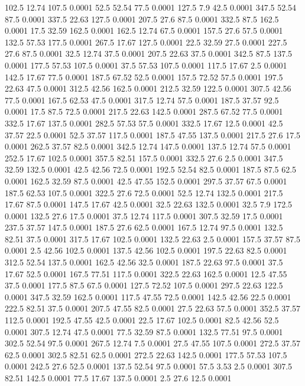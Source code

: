 102.5	12.74	107.5	0.0001
52.5	52.54	77.5	0.0001
127.5	7.9	42.5	0.0001
347.5	52.54	87.5	0.0001
337.5	22.63	127.5	0.0001
207.5	27.6	87.5	0.0001
332.5	87.5	162.5	0.0001
17.5	32.59	162.5	0.0001
162.5	12.74	67.5	0.0001
157.5	27.6	57.5	0.0001
132.5	57.53	177.5	0.0001
267.5	17.67	127.5	0.0001
22.5	32.59	27.5	0.0001
227.5	27.6	87.5	0.0001
32.5	12.74	37.5	0.0001
207.5	22.63	37.5	0.0001
342.5	87.5	137.5	0.0001
177.5	57.53	107.5	0.0001
37.5	57.53	107.5	0.0001
117.5	17.67	2.5	0.0001
142.5	17.67	77.5	0.0001
187.5	67.52	52.5	0.0001
157.5	72.52	57.5	0.0001
197.5	22.63	47.5	0.0001
312.5	42.56	162.5	0.0001
212.5	32.59	122.5	0.0001
307.5	42.56	77.5	0.0001
167.5	62.53	47.5	0.0001
317.5	12.74	57.5	0.0001
187.5	37.57	92.5	0.0001
17.5	87.5	72.5	0.0001
217.5	22.63	142.5	0.0001
287.5	67.52	77.5	0.0001
332.5	17.67	137.5	0.0001
282.5	57.53	57.5	0.0001
332.5	17.67	12.5	0.0001
42.5	37.57	22.5	0.0001
52.5	37.57	117.5	0.0001
187.5	47.55	137.5	0.0001
217.5	27.6	17.5	0.0001
262.5	37.57	82.5	0.0001
342.5	12.74	147.5	0.0001
137.5	12.74	57.5	0.0001
252.5	17.67	102.5	0.0001
357.5	82.51	157.5	0.0001
332.5	27.6	2.5	0.0001
347.5	32.59	132.5	0.0001
42.5	42.56	72.5	0.0001
192.5	52.54	82.5	0.0001
187.5	87.5	62.5	0.0001
162.5	32.59	87.5	0.0001
42.5	47.55	152.5	0.0001
297.5	37.57	67.5	0.0001
187.5	62.53	107.5	0.0001
322.5	27.6	72.5	0.0001
52.5	12.74	132.5	0.0001
217.5	17.67	87.5	0.0001
147.5	17.67	42.5	0.0001
32.5	22.63	132.5	0.0001
32.5	7.9	172.5	0.0001
132.5	27.6	17.5	0.0001
37.5	12.74	117.5	0.0001
307.5	32.59	17.5	0.0001
237.5	37.57	147.5	0.0001
187.5	27.6	62.5	0.0001
167.5	12.74	97.5	0.0001
132.5	82.51	37.5	0.0001
317.5	17.67	102.5	0.0001
132.5	22.63	2.5	0.0001
157.5	37.57	87.5	0.0001
2.5	42.56	102.5	0.0001
137.5	42.56	102.5	0.0001
197.5	22.63	82.5	0.0001
312.5	52.54	137.5	0.0001
162.5	42.56	32.5	0.0001
187.5	22.63	97.5	0.0001
37.5	17.67	52.5	0.0001
167.5	77.51	117.5	0.0001
322.5	22.63	162.5	0.0001
12.5	47.55	37.5	0.0001
177.5	87.5	67.5	0.0001
127.5	72.52	107.5	0.0001
297.5	22.63	122.5	0.0001
347.5	32.59	162.5	0.0001
117.5	47.55	72.5	0.0001
142.5	42.56	22.5	0.0001
222.5	82.51	37.5	0.0001
207.5	47.55	82.5	0.0001
27.5	22.63	57.5	0.0001
352.5	37.57	112.5	0.0001
192.5	47.55	42.5	0.0001
22.5	17.67	102.5	0.0001
82.5	42.56	52.5	0.0001
307.5	12.74	47.5	0.0001
77.5	32.59	87.5	0.0001
132.5	77.51	97.5	0.0001
302.5	52.54	97.5	0.0001
267.5	12.74	7.5	0.0001
27.5	47.55	107.5	0.0001
272.5	37.57	62.5	0.0001
302.5	82.51	62.5	0.0001
272.5	22.63	142.5	0.0001
177.5	57.53	107.5	0.0001
242.5	27.6	52.5	0.0001
137.5	52.54	97.5	0.0001
57.5	3.53	2.5	0.0001
307.5	82.51	142.5	0.0001
77.5	17.67	137.5	0.0001
2.5	27.6	12.5	0.0001

